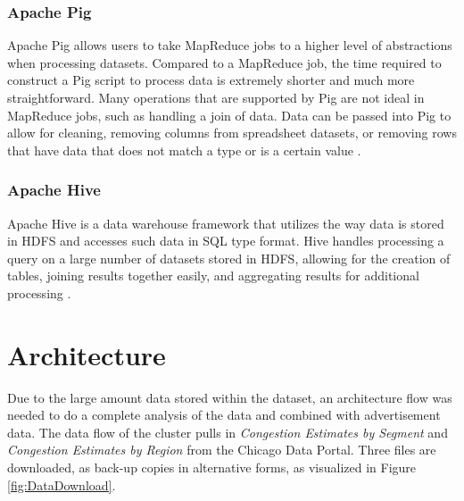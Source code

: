 \documentclass[titlepage,twocolumn]{article}
\newcommand{\HadoopEcosystem}{Hadoop Ecosystem}
\begin{document}
\subsubsection{Apache Pig}

Apache Pig allows users to take MapReduce jobs to a higher level of abstractions when processing datasets. Compared to a MapReduce job, the time required to construct a Pig script to process data is extremely shorter and much more straightforward. Many operations that are supported by Pig are not ideal in MapReduce jobs, such as handling a join of data. Data can be passed into Pig to allow for cleaning, removing columns from spreadsheet datasets, or removing rows that have data that does not match a type or is a certain value \cite{white_2015:Ch16}. 

\subsubsection{Apache Hive}

Apache Hive is a data warehouse framework that utilizes the way data is stored in HDFS and accesses such data in SQL type format. Hive handles processing a query on a large number of datasets stored in HDFS, allowing for the creation of tables, joining results together easily, and aggregating results for additional processing \cite{white_2015:Ch17}. 


\section{Architecture}


\par Due to the large amount data stored within the dataset, an architecture flow was needed to do a complete analysis of the data and combined with advertisement data. The data flow of the cluster pulls in \textit{Congestion Estimates by Segment} and \textit{Congestion Estimates by Region} from the Chicago Data Portal. Three files are downloaded, as back-up copies in alternative forms, as visualized in Figure \ref{fig:DataDownload}. 
\end{document}
